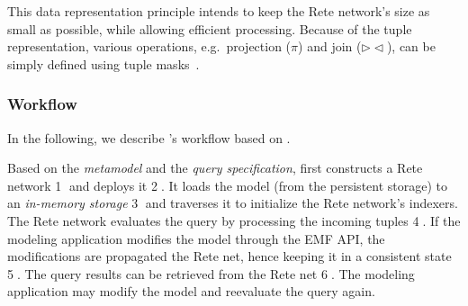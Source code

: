 This data representation principle intends to keep the Rete network's size as small as possible, while allowing efficient processing. Because of the tuple representation, various operations, e.g.\ projection ($ \pi $) and join ($ \rhd\!\!\lhd $), can be simply defined using tuple masks~\cite{BergmannMasters}.

\subsubsection{Workflow}
\label{eiq-workflow}


In the following, we describe \eiq{}'s workflow based on . 

Based on the \emph{metamodel} and the \emph{query specification}, \iqd{} first constructs a Rete network \textcircled{1} and deploys it \textcircled{2}. It loads the model (from the persistent storage) to an \emph{in-memory storage} \textcircled{3} and traverses it to initialize the Rete network's indexers. The Rete network evaluates the query by processing the incoming tuples \textcircled{4}. If the modeling application modifies the model through the EMF API, the modifications are propagated the Rete net, hence keeping it in a consistent state \textcircled{5}. The query results can be retrieved from the Rete net \textcircled{6}. The modeling application may modify the model and reevaluate the query again.
